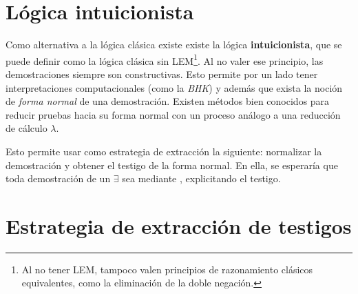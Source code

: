 \section{Lógica intuicionista}

Como alternativa a la lógica clásica existe existe la lógica
\textbf{intuicionista}, que se puede definir como la lógica clásica sin
LEM\footnote{Al no tener LEM, tampoco valen principios de razonamiento clásicos
equivalentes, como la eliminación de la doble negación.}. Al no valer ese
principio, las demostraciones siempre son constructivas. Esto permite por un
lado tener interpretaciones computacionales (como la \textit{BHK}) y además que
exista la noción de \textit{forma normal} de una demostración. Existen métodos
bien conocidos para reducir pruebas hacia su forma normal con un proceso análogo
a una reducción de cálculo $\lambda$.

Esto permite usar como estrategia de extracción la siguiente: normalizar la
demostración y obtener el testigo de la forma normal. En ella, se esperaría que
toda demostración de un $\exists$ sea mediante , explicitando el
testigo.

\section{Estrategia de extracción de testigos}

